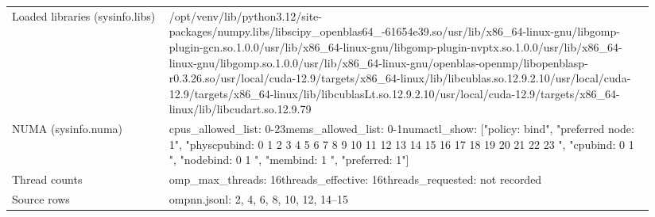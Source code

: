 \begin{longtable}{>{\raggedright\arraybackslash}p{0.23\linewidth}>{\raggedright\arraybackslash}p{0.71\linewidth}}
Loaded libraries (sysinfo.libs) & /\allowbreak{}opt/\allowbreak{}venv/\allowbreak{}lib/\allowbreak{}python3.12/\allowbreak{}site-packages/\allowbreak{}numpy.libs/\allowbreak{}libscipy\_\allowbreak{}openblas64\_\allowbreak{}-61654e39.so\newline /\allowbreak{}usr/\allowbreak{}lib/\allowbreak{}x86\_\allowbreak{}64-linux-gnu/\allowbreak{}libgomp-plugin-gcn.so.1.0.0\newline /\allowbreak{}usr/\allowbreak{}lib/\allowbreak{}x86\_\allowbreak{}64-linux-gnu/\allowbreak{}libgomp-plugin-nvptx.so.1.0.0\newline /\allowbreak{}usr/\allowbreak{}lib/\allowbreak{}x86\_\allowbreak{}64-linux-gnu/\allowbreak{}libgomp.so.1.0.0\newline /\allowbreak{}usr/\allowbreak{}lib/\allowbreak{}x86\_\allowbreak{}64-linux-gnu/\allowbreak{}openblas-openmp/\allowbreak{}libopenblasp-r0.3.26.so\newline /\allowbreak{}usr/\allowbreak{}local/\allowbreak{}cuda-12.9/\allowbreak{}targets/\allowbreak{}x86\_\allowbreak{}64-linux/\allowbreak{}lib/\allowbreak{}libcublas.so.12.9.2.10\newline /\allowbreak{}usr/\allowbreak{}local/\allowbreak{}cuda-12.9/\allowbreak{}targets/\allowbreak{}x86\_\allowbreak{}64-linux/\allowbreak{}lib/\allowbreak{}libcublasLt.so.12.9.2.10\newline /\allowbreak{}usr/\allowbreak{}local/\allowbreak{}cuda-12.9/\allowbreak{}targets/\allowbreak{}x86\_\allowbreak{}64-linux/\allowbreak{}lib/\allowbreak{}libcudart.so.12.9.79 \\
NUMA (sysinfo.numa) & cpus\_\allowbreak{}allowed\_\allowbreak{}list: 0-23\newline mems\_\allowbreak{}allowed\_\allowbreak{}list: 0-1\newline numactl\_\allowbreak{}show: ["policy: bind", "preferred node: 1", "physcpubind: 0 1 2 3 4 5 6 7 8 9 10 11 12 13 14 15 16 17 18 19 20 21 22 23 ", "cpubind: 0 1 ", "nodebind: 0 1 ", "membind: 1 ", "preferred: 1"] \\
Thread counts & omp\_\allowbreak{}max\_\allowbreak{}threads: 16\newline threads\_\allowbreak{}effective: 16\newline threads\_\allowbreak{}requested: not recorded \\
Source rows & ompnn.jsonl: 2, 4, 6, 8, 10, 12, 14–15 \\
\end{longtable}
